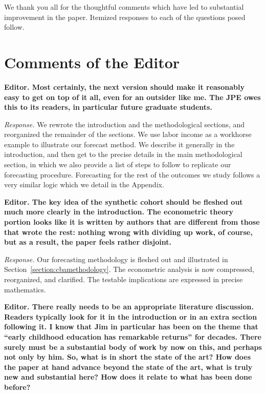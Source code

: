 \doublespacing

\noindent We thank you all for the thoughtful comments which have led to substantial improvement in the paper. Itemized responses to each of the questions posed follow.

\section{Comments of the Editor}

\noindent \textbf{Editor. Most certainly, the next version should make it reasonably easy to get on top of it all, even for an outsider like me. The JPE owes this to its readers, in particular future graduate students.}

\noindent \textit{Response.} We rewrote the introduction and the methodological sections, and reorganized the remainder of the sections. We use labor income as a workhorse example to illustrate our forecast method. We describe it generally in the introduction, and then get to the precise details in the main methodological section, in which we also provide a list of steps to follow to replicate our forecasting procedure. Forecasting for the rest of the outcomes we study follows a very similar logic which we detail in the Appendix.

\noindent \textbf{Editor. The key idea of the synthetic cohort should be fleshed out much more clearly in the introduction. The econometric theory portion looks like it is written by authors that are different from those that wrote the rest: nothing wrong with dividing up work, of course, but as a result, the paper feels rather disjoint.}

\noindent \textit{Response.} Our forecasting methodology is fleshed out and illustrated in Section~\ref{section:cbamethodology}. The econometric analysis is now compressed, reorganized, and clarified. The testable implications are expressed in precise mathematics.

\noindent \textbf{Editor. There really needs to be an appropriate literature discussion. Readers typically look for it in the introduction or in an extra section following it. I know that Jim in particular has been on the theme that ``early childhood education has remarkable returns'' for decades. There surely must be a substantial body of work by now on this, and perhaps not only by him. So, what is in short the state of the art? How does the paper at hand advance beyond the state of the art, what is truly new and substantial here? How does it relate to what has been done before?}

